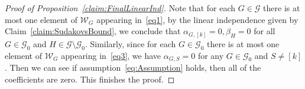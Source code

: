\documentclass[10pt,a4paper]{amsart}
\begin{document}
\begin{proof}[Proof of Proposition~\ref{claim:FinalLinearInd}]
      Note that for each $G\in \mathcal{G}$ there is at most one element of $\mathcal{W}_G$ appearing in~\eqref{eq1}, by the linear independence given by Claim~\ref{claim:SudakovsBound}, we conclude that $\alpha_{G,[k]}=0,\beta_{H}=0$ for all $G\in \mathcal{G}_0$ and $H\in \mathcal{G}\setminus\mathcal{G}_{0}$.
     Similarly, since for each $G\in \mathcal{G}_{0}$ there is at most one element of $\mathcal{W}_G$ appearing in~\eqref{eq3}, we have $\alpha_{G,S}=0$ for any $G\in \mathcal{G}_{0}$ and $S\neq [k]$. Then we can see if assumption~\eqref{eq:Assumption} holds, then all of the coefficients are zero. This finishes the proof.



    
\end{proof}
\end{document}
